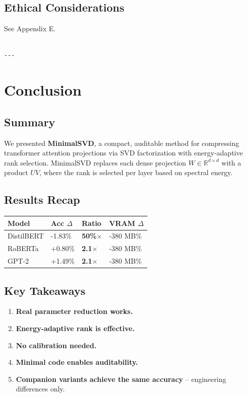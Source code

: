 \subsection{Ethical Considerations}

See Appendix E.
\begin{lstlisting}

---
\end{lstlisting}


\section{Conclusion}

\subsection{Summary}

We presented \textbf{MinimalSVD}, a compact, auditable method for compressing 
transformer attention projections via SVD factorization with energy-adaptive 
rank selection. MinimalSVD replaces each dense projection 
$W \in \mathbb{R}^{d \times d}$ with a product $U V$, where the rank is 
selected per layer based on spectral energy.

\subsection{Results Recap}

\begin{table}[H]
\centering
\small
\begin{tabular}{llll}
\toprule
\textbf{Model} & \textbf{Acc $\Delta$} & \textbf{Ratio} & \textbf{VRAM $\Delta$} \\
\midrule
DistilBERT & -1.83\% & \textbf{50\%$\times$} & -380 MB\% \\
RoBERTa & +0.80\% & \textbf{2.1$\times$} & -380 MB\% \\
GPT-2 & +1.49\% & \textbf{2.1$\times$} & -380 MB\% \\
\bottomrule
\end{tabular}
\end{table}

\subsection{Key Takeaways}

\begin{enumerate}
\item \textbf{Real parameter reduction works.}
\item \textbf{Energy-adaptive rank is effective.}
\item \textbf{No calibration needed.}
\item \textbf{Minimal code enables auditability.}
\item \textbf{Companion variants achieve the same accuracy} -- engineering
  differences only.

\end{enumerate}
